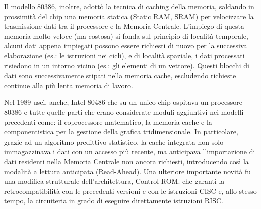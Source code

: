 \documentclass[12pt]{article}
\begin{document}
Il modello 80386, inoltre, adottò la tecnica di caching della memoria, saldando in prossimità del chip una memoria statica (Static RAM, SRAM) per velocizzare la trasmissione dati tra il processore e la Memoria Centrale. L’impiego di questa memoria molto veloce (ma costosa) si fonda sul principio di località temporale, alcuni dati appena impiegati possono essere richiesti di nuovo per la successiva elaborazione (es.: le istruzioni nei cicli), e di località spaziale, i dati processati risiedono in un intorno vicino (es.: gli elementi di un vettore). Questi blocchi di dati sono successivamente stipati nella memoria cache, escludendo richieste continue alla più lenta memoria di lavoro.\par\medskip\noindent
Nel 1989 uscì, anche, Intel 80486 che su un unico chip ospitava un processore 80386 e tutte quelle parti che erano considerate moduli aggiuntivi nei modelli precedenti come: il coprocessore matematico, la memoria cache e la componentistica per la gestione della grafica tridimensionale. In particolare, grazie ad un algoritmo predittivo statistico, la cache integrata non solo immagazzinava i dati con un accesso più recente, ma anticipava l’importazione di dati residenti nella Memoria Centrale non ancora richiesti, introducendo così la modalità a lettura anticipata (Read-Ahead). Una ulteriore importante novità fu una modifica strutturale dell’architettura, Control ROM. che garantì la retrocompatibilità con le precedenti versioni e con le istruzioni CISC e, allo stesso tempo, la circuiteria in grado di eseguire direttamente istruzioni RISC. 
\par\medskip\noindent
\end{document}
